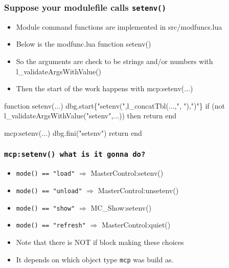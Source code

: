 \documentclass{beamer}
\begin{document}
\begin{frame}[fragile]
    \frametitle{Suppose your modulefile calls \texttt{setenv()}}
  \begin{itemize}
    \item Module command functions are implemented in src/modfuncs.lua
    \item Below is the modfunc.lua function setenv()
    \item So the arguments are check to be strings and/or numbers with l\_validateArgsWithValue()
    \item  Then the start of the work happens with mcp:setenv(...)
  \end{itemize}
 {\tiny
    \begin{semiverbatim}
function setenv(...)
   dbg.start\{"setenv(",l_concatTbl({...},", "),")"\}
   if (not l_validateArgsWithValue("setenv",...)) then return end

   mcp:setenv(...)
   dbg.fini("setenv")
   return
end
    \end{semiverbatim}
}
\end{frame}

\begin{frame}[fragile]
    \frametitle{\texttt{mcp:setenv() what is it gonna do?}}
  \begin{itemize}
    \item \texttt{mode() == "load"} $\Rightarrow$ MasterControl:setenv()
    \item \texttt{mode() == "unload"} $\Rightarrow$ MasterControl:unsetenv()
    \item \texttt{mode() == "show"} $\Rightarrow$ MC\_Show:setenv()
    \item \texttt{mode() == "refresh"} $\Rightarrow$ MasterControl:quiet()
    \item Note that there is NOT if block making these choices
    \item It depends on which object type \texttt{mcp} was build as. 
  \end{itemize}
\end{frame}
\end{document}
